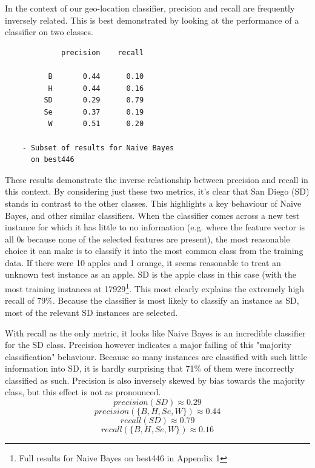 \documentclass[twocolumn]{article}
\begin{document}
In the context of our geo-location classifier, precision and recall are frequently inversely related. This is best demonstrated by looking at the performance of a classifier on two classes.
\begin{verbatim}
             precision    recall

          B       0.44      0.10
          H       0.44      0.16
         SD       0.29      0.79
         Se       0.37      0.19
          W       0.51      0.20
          
    - Subset of results for Naive Bayes 
      on best446
\end{verbatim}

These results demonstrate the inverse relationship between precision and recall in this context. By considering just these two metrics, it's clear that San Diego (SD) stands in contrast to the other classes. This highlights a key behaviour of Naive Bayes, and other similar classifiers. When the classifier comes across a new test instance for which it has little to no information (e.g. where the feature vector is all 0s because none of the selected features are present), the most reasonable choice it can make is to classify it into the most common class from the training data. If there were 10 apples and 1 orange, it seems reasonable to treat an unknown test instance as an apple. SD is the apple class in this case (with the most training instances at 17929\footnote{Full results for Naive Bayes on best446 in Appendix 1}. This most clearly explains the extremely high recall of 79\%. Because the classifier is most likely to classify an instance as SD, most of the relevant SD instances are selected.

With recall as the only metric, it looks like Naive Bayes is an incredible classifier for the SD class. Precision however indicates a major failing of this "majority classification" behaviour. Because so many instances are classified with such little information into SD, it is hardly surprising that 71\% of them were incorrectly classified as such. Precision is also inversely skewed by bias towards the majority class, but this effect is not as pronounced.
\begin{equation}
precision(SD) \approx 0.29
\end{equation}
\begin{equation}
precision(\{B, H, Se, W\}) \approx 0.44
\end{equation}
\begin{equation}
recall(SD) \approx 0.79
\end{equation}
\begin{equation}
recall(\{B, H, Se, W\}) \approx 0.16
\end{equation}
\end{document}
